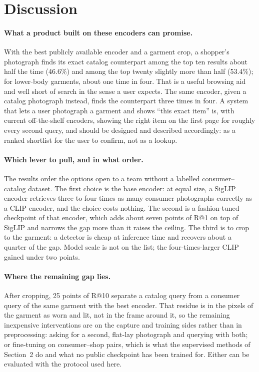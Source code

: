 \documentclass[10pt,twocolumn,letterpaper]{article}
\makeatletter
\newcommand{\recall}[1]{R@#1}
\makeatother
\begin{document}
\section{Discussion}

\paragraph{What a product built on these encoders can promise.}
With the best publicly available encoder and a garment crop, a shopper's photograph finds its exact catalog counterpart among the top ten results about half the time (46.6\%) and among the top twenty slightly more than half (53.4\%); for lower-body garments, about one time in four. That is a useful browsing aid and well short of search in the sense a user expects. The same encoder, given a catalog photograph instead, finds the counterpart three times in four. A system that lets a user photograph a garment and shows ``this exact item'' is, with current off-the-shelf encoders, showing the right item on the first page for roughly every second query, and should be designed and described accordingly: as a ranked shortlist for the user to confirm, not as a lookup.

\paragraph{Which lever to pull, and in what order.}
The results order the options open to a team without a labelled consumer--catalog dataset. The first choice is the base encoder: at equal size, a SigLIP encoder retrieves three to four times as many consumer photographs correctly as a CLIP encoder, and the choice costs nothing. The second is a fashion-tuned checkpoint of that encoder, which adds about seven points of \recall{1} on top of SigLIP and narrows the gap more than it raises the ceiling. The third is to crop to the garment: a detector is cheap at inference time and recovers about a quarter of the gap. Model scale is not on the list; the four-times-larger CLIP gained under two points.

\paragraph{Where the remaining gap lies.}
After cropping, 25 points of \recall{10} separate a catalog query from a consumer query of the same garment with the best encoder. That residue is in the pixels of the garment as worn and lit, not in the frame around it, so the remaining inexpensive interventions are on the capture and training sides rather than in preprocessing: asking for a second, flat-lay photograph and querying with both; or fine-tuning on consumer--shop pairs, which is what the supervised methods of Section~2 do and what no public checkpoint has been trained for. Either can be evaluated with the protocol used here.
\end{document}
